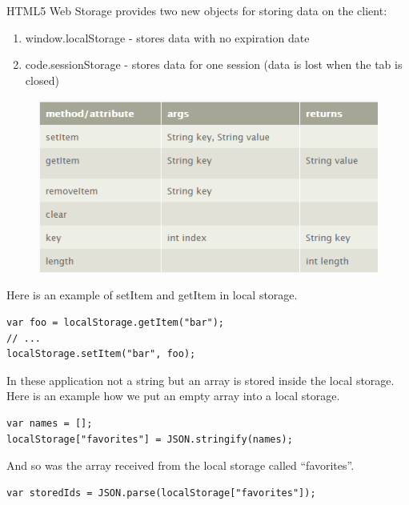 HTML5 Web Storage provides two new objects for storing data on the client:
\begin{enumerate}
\item window.localStorage - stores data with no expiration date
\item code.sessionStorage - stores data for one session (data is lost when the tab is closed)
\end{enumerate}
\newpage

\begin{figure}[t]
\centering
\includegraphics[width=0.9\linewidth]{graphics/chapter4/20}
\caption{}
\label{fig:4}
\end{figure}


Here is an example of setItem and getItem in local storage.
\\

\begin{lstlisting}[language=html, caption= 
start timer function,captionpos=b]
var foo = localStorage.getItem("bar");
// ...
localStorage.setItem("bar", foo);
\end{lstlisting}

In these application not a string but an array is stored inside the local storage. Here is an example how we put an empty array into a local storage.
\\

\begin{lstlisting}[language=html, caption= 
start timer function,captionpos=b]
var names = [];
localStorage["favorites"] = JSON.stringify(names);
\end{lstlisting}

And so was the array received from the local storage called “favorites”.
\\
\begin{lstlisting}[language=html, caption= 
start timer function,captionpos=b]
var storedIds = JSON.parse(localStorage["favorites"]);
\end{lstlisting}

